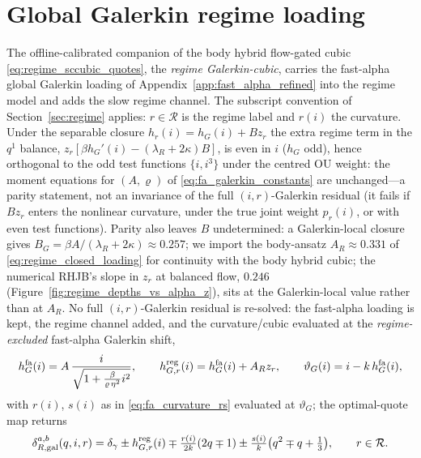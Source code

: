 \documentclass[11pt,a4paper]{article}
\theoremstyle{plain}
\theoremstyle{definition}
\begin{document}
\section{Global Galerkin regime loading}
\label{app:regime_refined}

The offline-calibrated companion of the body hybrid flow-gated cubic
\eqref{eq:regime_sccubic_quotes}, the \emph{regime Galerkin-cubic}, carries the
fast-alpha global Galerkin loading of Appendix~\ref{app:fast_alpha_refined} into
the regime model and adds the slow regime channel.  The subscript convention of
Section~\ref{sec:regime} applies: \(r\in\mathcal R\) is the regime label and
\(r(i)\) the curvature.  Under the separable closure
\(h_r(i)=h_G(i)+Bz_r\) the extra regime term in the \(q^1\) balance,
\(z_r[\beta h_G'(i)-(\lambda_R+2\kappa)B]\), is even in \(i\) (\(h_G\) odd),
hence orthogonal to the odd test functions \(\{i,i^3\}\) under the centred OU
weight: the moment equations for \((A,\varrho)\) of
\eqref{eq:fa_galerkin_constants} are unchanged---a parity statement, not an
invariance of the full \((i,r)\)-Galerkin residual (it fails if
\(Bz_r\) enters the nonlinear curvature, under the true joint weight
\(p_r(i)\), or with even test functions).  Parity also leaves \(B\)
undetermined: a Galerkin-local closure gives
\(B_G=\beta A/(\lambda_R+2\kappa)\approx0.257\); we import the body-ansatz
\(A_R\approx0.331\) of \eqref{eq:regime_closed_loading} for continuity with the
body hybrid cubic; the numerical RHJB's slope in \(z_r\) at balanced flow,
\(0.246\) (Figure~\ref{fig:regime_depths_vs_alpha_z}), sits at the
Galerkin-local value rather than at \(A_R\).  No full \((i,r)\)-Galerkin residual is re-solved: the
fast-alpha loading is kept, the regime channel added, and the curvature/cubic
evaluated at the \emph{regime-excluded} fast-alpha Galerkin shift,
\begin{equation}
h_G^{\rm fa}(i)=A\,\frac{i}{\sqrt{1+\tfrac{\beta}{\varrho\,\eta^2}i^2}},\qquad
h_{G,r}^{\rm reg}(i)=h_G^{\rm fa}(i)+A_R z_r,\qquad
\vartheta_G(i)=i-k\,h_G^{\rm fa}(i),\label{eq:regime_galerkin_loading}
\end{equation}
with \(r(i)\), \(s(i)\) as in \eqref{eq:fa_curvature_rs} evaluated at
\(\vartheta_G\); the optimal-quote map returns
\begin{equation}
\delta_{R,\rm gal}^{a,b}(q,i,r)=\delta_\gamma\pm h_{G,r}^{\rm reg}(i)
\mp\tfrac{r(i)}{2k}(2q\mp1)\pm\tfrac{s(i)}{k}\bigl(q^2\mp q+\tfrac13\bigr),
\qquad r\in\mathcal R.\label{eq:regime_galerkin_quotes}
\end{equation}
\end{document}
